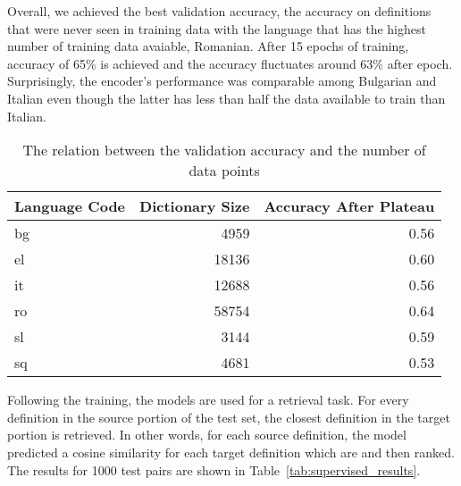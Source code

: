 Overall, we achieved the best validation accuracy, the accuracy on definitions that were never seen in training data with the language that has the highest number of training data avaiable, Romanian.
After 15 epochs of training, accuracy of 65\% is achieved and the accuracy fluctuates around 63\% after  epoch.
Surprisingly, the encoder's performance was comparable among Bulgarian and Italian even though the latter has less than half the data available to train than Italian.

\begin{table}[htbp]
    \centering
    \begin{tabulary}{1\linewidth}{L R R}
        \toprule
        Language Code & Dictionary Size & Accuracy After Plateau  \\
        \midrule
        bg & 4959 & 0.56  \\
        el & 18136 & 0.60  \\
        it & 12688 & 0.56  \\
        ro & 58754 & 0.64  \\
        sl & 3144 & 0.59  \\
        sq & 4681 & 0.53 \\
        \bottomrule
    \end{tabulary}
    \caption{The relation between the validation accuracy and the number of data points}%
    \label{tab:lstm_size_acc}
\end{table}

Following the training, the models are used for a retrieval task.
For every definition in the source portion of the test set, the closest definition in the target portion is retrieved.
In other words, for each source definition, the model predicted a cosine similarity for each target definition which are and then ranked.
The results for 1000 test pairs are shown in Table~\ref{tab:supervised_results}.



